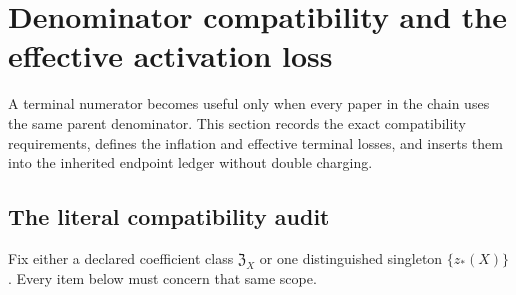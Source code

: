 \section{Denominator compatibility and the effective activation loss}
\label{sec:tpc64-compatible-chain}

A terminal numerator becomes useful only when every paper in the chain
uses the same parent denominator.  This section records the exact
compatibility requirements, defines the inflation and effective terminal
losses, and inserts them into the inherited endpoint ledger without
double charging.

\subsection{The literal compatibility audit}

Fix either a declared coefficient class
\(\mathfrak Z_X\) or one distinguished singleton
\(\{z_*(X)\}\).  Every item below must concern that same scope.


